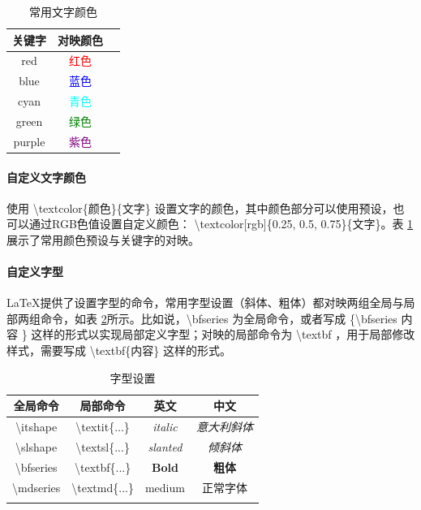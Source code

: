 \documentclass[AutoFakeBold]{ZafuThesis}
\begin{document}
\begin{table}[htbp]
    \centering
    \caption{常用文字颜色}
    \begin{tabular}{c c c}
      \toprule[1pt]
      关键字 & 对映颜色\\
      \hline
      red &  \textcolor{red}{红色} \\
      blue &  \textcolor{blue}{蓝色} \\
      cyan &  \textcolor{cyan}{青色} \\
      green &  \textcolor{green}{绿色} \\
      purple &  \textcolor{purple}{紫色} \\
      \toprule[1pt]
    \end{tabular}
    \label{table_常用文字颜色}
\end{table}\par

\paragraph{自定义文字颜色}
使用 \textbackslash textcolor\{颜色\}\{文字\} 设置文字的颜色，其中颜色部分可以使用预设，也可以通过RGB色值设置自定义颜色： \textbackslash textcolor[rgb]\{0.25, 0.5, 0.75\}\{文字\}。表 \ref{table_常用文字颜色}展示了常用颜色预设与关键字的对映。

\paragraph{自定义字型}
\LaTeX 提供了设置字型的命令，常用字型设置（斜体、粗体）都对映两组全局与局部两组命令，如表 \ref{table_字型设置}所示。比如说，\textbackslash bfseries 为全局命令，或者写成 \{\textbackslash bfseries 内容 \} 这样的形式以实现局部定义字型；对映的局部命令为 \textbackslash textbf ，用于局部修改样式，需要写成 \textbackslash textbf\{内容\} 这样的形式。
\begin{table}[htbp]
  \centering
  \caption{字型设置}
  \begin{tabular}{c c c c}
    \toprule[1pt]
    全局命令 & 局部命令 & 英文 & 中文 \\
    \hline
    \textbackslash itshape  & \textbackslash textit\{...\} & \textit{italic}& \textit{意大利斜体} \\
    \textbackslash slshape  & \textbackslash textsl\{...\} & \textsl{slanted}& \textsl{倾斜体} \\
    \textbackslash bfseries  & \textbackslash textbf\{...\} & \textbf{Bold}& \textbf{粗体} \\
    \textbackslash mdseries  & \textbackslash textmd\{...\} & \textmd{medium}& \textmd{正常字体} \\
    \toprule[1pt]
    \label{table_字型设置}
  \end{tabular}
\end{table}
\end{document}
